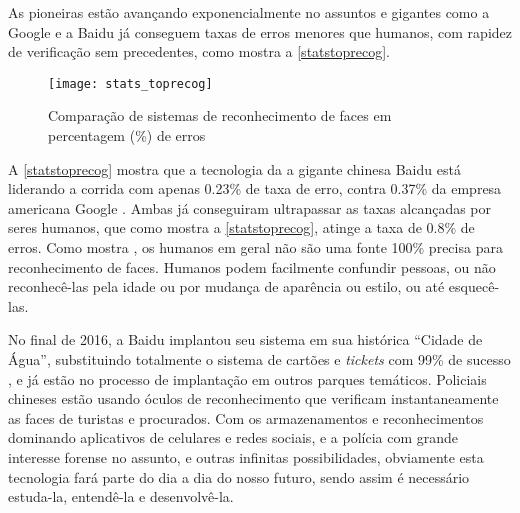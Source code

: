 As pioneiras estão avançando exponencialmente no assuntos e gigantes como a Google e a Baidu já conseguem taxas de erros menores que humanos, com rapidez de verificação sem precedentes, como mostra a \autoref{statstoprecog}.

\vspace*{10cm}
\begin{figure}[h]
	\centering
	\texttt{[image: stats\_toprecog]}
	\caption{Comparação de sistemas de reconhecimento de faces em percentagem (\%) de erros}
	\label{statstoprecog}
\end{figure}


A \autoref{statstoprecog} mostra que a tecnologia da a gigante chinesa Baidu está liderando a corrida com apenas 0.23\% de taxa de erro, contra 0.37\% da empresa americana Google \cite{stats_economy_compass_2017}. Ambas já conseguiram ultrapassar as taxas alcançadas por seres humanos, que como mostra a \autoref{statstoprecog}, atinge a taxa de 0.8\% de erros. Como mostra \cite{stats_economy_compass_2017}, os humanos em geral não são uma fonte 100\% precisa para reconhecimento de faces. Humanos podem facilmente confundir pessoas, ou não reconhecê-las pela idade ou por mudança de aparência ou estilo, ou até esquecê-las.

No final de 2016, a Baidu implantou seu sistema em sua histórica “Cidade de Água”, substituindo totalmente o sistema de cartões e \textit{tickets} com 99\% de sucesso \cite{baidiu_theverge}, e já estão no processo de implantação em outros parques temáticos. Policiais chineses estão usando óculos de reconhecimento que verificam instantaneamente as faces de turistas e procurados. Com os armazenamentos e reconhecimentos dominando aplicativos de celulares e redes sociais, e a polícia com grande interesse forense no assunto, e outras infinitas possibilidades, obviamente esta tecnologia fará parte do dia a dia do nosso futuro, sendo assim é necessário estuda-la, entendê-la e desenvolvê-la.










